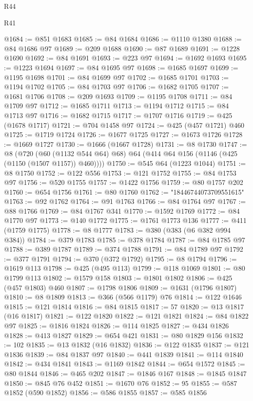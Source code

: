 \begin{lexlean}{R44}
\begin{lexlean}{R41}
\begin{coremodule}
{{{{{{{{{{{{{{{{{{{{{{{{{{{{{{{{{{{{{{{{{{{{{{{{{{{{{{{{{{{{{{{{{{{{{{{{{{{{{{{{{{{{{{{@1684 := @851 @1683
@1685 := @84 @1684
@1686 := @1110 @1380
@1688 := @84 @1686 @97
@1689 := @209 @1688
@1690 := @87 @1689
@1691 := @1228 @1690
@1692 := @84 @1691
@1693 := @223 @97
@1694 := @1692 @1693
@1695 := @1223 @1694
@1697 := @84 @1695 @97
@1698 := @1685 @1697
@1699 := @1195 @1698
@1701 := @84 @1699 @97
@1702 := @1685 @1701
@1703 := @1194 @1702
@1705 := @84 @1703 @97
@1706 := @1682 @1705
@1707 := @1681 @1706
@1708 := @209 @1693
@1709 := @1195 @1708
@1711 := @84 @1709 @97
@1712 := @1685 @1711
@1713 := @1194 @1712
@1715 := @84 @1713 @97
@1716 := @1682 @1715
@1717 := @1707 @1716
@1719 := @425 (@1678 @1717)
@1721 := @704 @1458 @97
@1724 := @425 (@457 @1721) @460
@1725 := @1719 @1724
@1726 := @1677 @1725
@1727 := @1673 @1726
@1728 := @1669 @1727
@1730 := @1666 (@1667 @1728)
@1731 := @8 @1730
@1747 := @8
    (@720 (@60 (@1132 @544 @64) @68) @64 (@414 @64 @156 (@1146 (@425 (@1150 (@1507 @1157)) @460))))
@1750 := @545 @64 (@1223 @1044)
@1751 := @8 @1750
@1752 := @122 @556
@1753 := @121 @1752
@1755 := @84 @1753 @97
@1756 := @520 @1755
@1757 := @1422 @1756
@1759 := @80 @1757 @202
@1760 := @654 @1756
@1761 := @80 @1760
@1762 := "18446744073709551615"
@1763 := @92 @1762
@1764 := @91 @1763
@1766 := @84 @1764 @97
@1767 := @88 @1766
@1769 := @84 @1767 @341
@1770 := @1592 @1769
@1772 := @84 @1770 @97
@1773 := @140 @1772
@1775 := @1761 @1773 @136
@1777 := @411 (@1759 @1775)
@1778 := @8 @1777
@1783 := @380 (@383 (@6 @382 @994 @384))
@1784 := @379 @1783
@1785 := @378 @1784
@1787 := @84 @1785 @97
@1788 := @389 @1787
@1789 := @374 @1788
@1791 := @84 @1789 @97
@1792 := @377 @1791
@1794 := @370 (@372 @1792)
@1795 := @8 @1794
@1796 := @1619 @113
@1798 := @425 (@495 @113)
@1799 := @118 @1069
@1801 := @80 @1799 @113
@1802 := @1579 @158
@1803 := @1801 @1802
@1806 := @425 (@457 @1803) @460
@1807 := @1798 @1806
@1809 := @1631 (@1796 @1807)
@1810 := @8 @1809
@1813 := @366 (@566 @1179) @76
@1814 := @122 @1646
@1815 := @121 @1814
@1816 := @84 @1815
@1817 := 57
@1820 := @13 @1817 (@16 @1817)
@1821 := @122 @1820
@1822 := @121 @1821
@1824 := @84 @1822 @97
@1825 := @1816 @1824
@1826 := @114 @1825
@1827 := @434 @1826
@1828 := @413 @1827
@1829 := @654 @421
@1831 := @80 @1829 @156
@1832 := 102
@1835 := @13 @1832 (@16 @1832)
@1836 := @122 @1835
@1837 := @121 @1836
@1839 := @84 @1837 @97
@1840 := @441 @1839
@1841 := @114 @1840
@1842 := @434 @1841
@1843 := @1169 @1842
@1844 := @654 @1572
@1845 := @80 @1844
@1846 := @465 @202
@1847 := @1846 @167
@1848 := @1845 @1847
@1850 := @845 @76 @452
@1851 := @1670 @76
@1852 := 95
@1855 := @587 @1852 (@590 @1852)
@1856 := @586 @1855
@1857 := @585 @1856
}}}}}}}}}}}}}}}}}}}}}}}}}}}}}}}}}}}}}}}}}}}}}}}}}}}}}}}}}}}}}}}}}}}}}}}}}}}}}}}}}}}}}}}
\end{coremodule}
\end{lexlean}
\end{lexlean}
